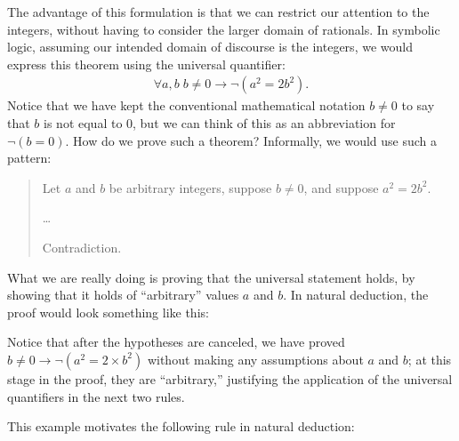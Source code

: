 \documentclass[letterpaper,10pt,english]{sphinxmanual}
\begin{document}
\sphinxAtStartPar
The advantage of this formulation is that we can restrict our attention to the integers, without having to consider the larger domain of rationals. In symbolic logic, assuming our intended domain of discourse is the integers, we would express this theorem using the universal quantifier:
\begin{equation*}
\begin{split}\forall  a, b \; b \ne 0 \to \neg (a^2 = 2 b^2).\end{split}
\end{equation*}
\sphinxAtStartPar
Notice that we have kept the conventional mathematical notation \(b \ne 0\) to say that \(b\) is not equal to 0, but we can think of this as an abbreviation for \(\neg (b = 0)\).  How do we prove such a theorem? Informally, we would use such a pattern:
\begin{quote}

\sphinxAtStartPar
Let \(a\) and \(b\) be arbitrary integers, suppose \(b \ne 0\), and suppose \(a^2 = 2 b^2\).

\sphinxAtStartPar
…

\sphinxAtStartPar
Contradiction.
\end{quote}

\sphinxAtStartPar
What we are really doing is proving that the universal statement holds, by showing that it holds of “arbitrary” values \(a\) and \(b\). In natural deduction, the proof would look something like this:



\begin{center}
\AXM{}
\noLine
\UIM{\vdots}
\AXM{}
\noLine
\UIM{\vdots}
\noLine
\BIM{\bot}
\DP
\end{center}

\sphinxAtStartPar
Notice that after the hypotheses are canceled, we have proved \(b \ne 0 \to \neg (a^2 = 2 \times b^2)\) without making any assumptions about \(a\) and \(b\); at this stage in the proof, they are “arbitrary,” justifying the application of the universal quantifiers in the next two rules.

\sphinxAtStartPar
This example motivates the following rule in natural deduction:



\begin{prooftree}
\end{prooftree}
\end{document}
